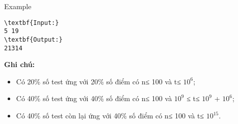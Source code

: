 Example
\begin{verbatim}
\textbf{Input:}
5 19
\textbf{Output:}
21314
\end{verbatim}

\textbf{\textbf{Ghi chú:}}
\begin{itemize}
	\item Có 20\% số test ứng với 20\% số điểm có n≤ 100 và t≤ $10^{6}$;
	\item Có 40\% số test ứng với 40\% số điểm có n≤ 100 và $10^{9}$ ≤ t≤ $10^{9}$ + $10^{6}$;
	\item Có 40\% số test còn lại ứng với 40\% số điểm có n≤ 100 và t≤ $10^{15}$.
\end{itemize}